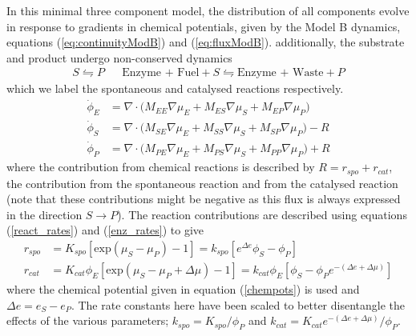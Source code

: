 In this minimal three component model, the distribution of all components evolve in response to gradients in chemical potentials, given by the Model B dynamics, equations (\ref{eq:continuityModB}) and (\ref{eq:fluxModB}). additionally, the substrate and product undergo non-conserved dynamics
\begin{equation}
    \begin{split}
    S \leftrightharpoons P
    &&
    \text{Enzyme + Fuel} + S \leftrightharpoons \text{Enzyme + Waste} + P
    \end{split}
\end{equation}
which we label the spontaneous and catalysed reactions respectively. 
\begin{align}
    \dot{\phi}_E &= \nabla \cdot \big(M_{EE}\nabla\mu_E + M_{ES}\nabla\mu_S + M_{EP}\nabla\mu_P) \label{evoE}\\
    \dot{\phi}_S &= \nabla \cdot \big(M_{SE}\nabla\mu_E + M_{SS}\nabla\mu_S + M_{SP}\nabla\mu_P) - R \label{evoS}\\
    \dot{\phi}_P &= \nabla \cdot \big(M_{PE}\nabla\mu_E + M_{PS}\nabla\mu_S + M_{PP}\nabla\mu_P) + R \label{evoP}
\end{align}
where the contribution from chemical reactions is described by $R = r_{spo} + r_{cat}$, the contribution from the spontaneous reaction and from the catalysed reaction (note that these contributions might be negative as this flux is always expressed in the direction $S \rightarrow P$). The reaction contributions are described using equations (\ref{react_rates}) and (\ref{enz_rates}) to give
\begin{align}
    r_{spo} &= K_{spo}[\text{exp}(\mu_S-\mu_P) - 1] = k_{spo}[e^{\Delta e}\phi_S - \phi_P] \\
    r_{cat} &= K_{cat}\phi_E[\text{exp}(\mu_S - \mu_P + \Delta\mu) - 1] = k_{cat}\phi_E[\phi_S-\phi_P e^{-(\Delta e+ \Delta\mu)}]
\end{align}
where the chemical potential given in equation (\ref{chempots}) is used and $\Delta e = e_S - e_P$. The rate constants here have been scaled to better disentangle the effects of the various parameters; $k_{spo} = K_{spo}/\phi_P$ and $k_{cat} = K_{cat}e^{-(\Delta e + \Delta \mu)}/\phi_P$.

